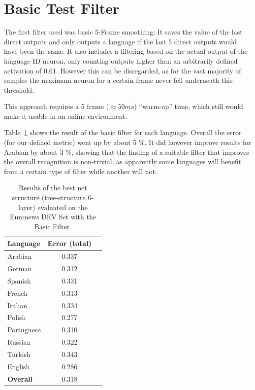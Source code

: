 \section{Basic Test Filter}
\label{sec:eval:basic}

The first filter used was basic 5-Frame smoothing: It saves the value of the last direct outputs and only outputs a language if the last 5 direct outputs would have been the same. It also includes a filtering based on the actual output of the language ID neuron, only counting outputs higher than an arbitrarily defined activation of 0.61. However this can be disregarded, as for the vast majority of samples the maximum neuron for a certain frame never fell underneath this threshold.

This approach requires a 5 frame (\(\approx 50 ms\)) ``warm-up'' time, which still would make it usable in an online environment.

Table~\ref{tab:basic} shows the result of the basic filter for each language. Overall the error (for our defined metric) went up by about 5 \%. It did however improve results for Arabian by about 3 \%, showing that the finding of a suitable filter that improves the overall recognition is non-trivial, as apparently some languages will benefit from a certain type of filter while another will not. 

\begin{table}[h!]
\centering
\caption{Results of the best net structure (tree-structure 6-layer) evaluated on the Euronews DEV Set with the Basic Filter.}
\label{tab:basic}
\begin{tabular}{| l | c | r | }
	\hline
	\textbf{Language} & \textbf{Error (total)}  \\
	\hline
	Arabian & 0.337  \\
	German & 0.312  \\
	Spanish & 0.331 \\ 
	French & 0.313 \\
	Italian & 0.334  \\
	Polish & 0.277 \\
	Portuguese& 0.310  \\
	Russian&  0.322 \\
	Turkish&  0.343 \\
	English&  0.286 \\
	\hline
	\textbf{Overall} & 0.318 \\
	\hline
\end{tabular}
\end{table}


